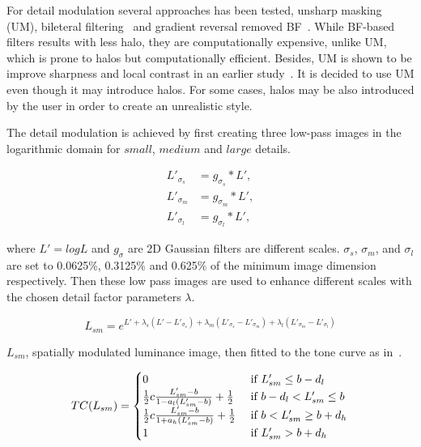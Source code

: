 For detail modulation several approaches has been tested, unsharp masking (UM), bileteral filtering~\cite{Tomasi98} and gradient reversal removed BF~\cite{Bae2006}. While BF-based filters results with less halo, they are computationally expensive, unlike UM, which is prone to halos but computationally efficient. Besides, UM is shown to be improve sharpness and local contrast in an earlier study~\cite{Trenta2012}. It is decided to use UM even though it may introduce halos. For some cases, halos may be also introduced by the user in order to create an unrealistic style.

The detail modulation is achieved by first creating three low-pass images in the logarithmic domain for $small$, $medium$ and $large$ details.

\begin{align}
L'_{\sigma_s} &= g _{\sigma_s} * L', \\
L'_{\sigma_m} &= g _{\sigma_m} * L', \\
L'_{\sigma_l} &= g _{\sigma_l} * L', 
\end{align}

where $L' = log L$ and $g_\sigma$ are 2D Gaussian filters are different scales. $\sigma_s$, $\sigma_m$, and $\sigma_l$ are set to 0.0625\%, 0.3125\% and 0.625\% of the minimum image dimension respectively. Then these low pass images are used to enhance different scales with the chosen detail factor parameters $\lambda$.

\begin{equation}
    L_{sm} = e^{L' + \lambda_s(L' - L'_{\sigma_s}) + \lambda_m(L'_{\sigma_s} - L'_{\sigma_m}) + \lambda_l(L'_{\sigma_m} - L'_{\sigma_l})}
\end{equation}

$L_{sm}$, spatially modulated luminance image, then fitted to the tone curve as in~\cite{mantiuk2008modeling}. 

\begin{equation}
    TC(L_{sm}) = 
    \begin{cases}
    0 &\text{  if  $L_{sm}' \leq b - d_l$ } \\
    \frac{1}{2}c {{L_{sm}' - b}\over{1 - a_l(L_{sm}'-b)}} + \frac{1}{2} &\text{ if $b - d_l < L_{sm}' \leq b $ } \\ 
    \frac{1}{2}c {{L_{sm}' - b}\over{1 + a_h(L_{sm}'-b)}} + \frac{1}{2} &\text{ if $b < L_{sm}' \geq b + d_h$} \\ 
    1 &\text{ if  $L_{sm}' > b + d_h$}
    \end{cases}
\end{equation}

